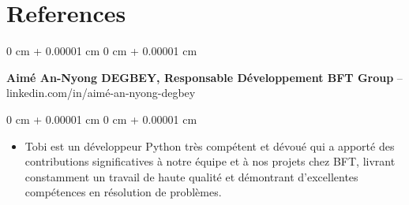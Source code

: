 \documentclass[10pt, letterpaper]{article}
\newenvironment{highlights}{
    \begin{itemize}[
        topsep=0.10 cm,
        parsep=0.10 cm,
        partopsep=0pt,
        itemsep=0pt,
        leftmargin=0 cm + 10pt
    ]
}{
    \end{itemize}
} %
\newenvironment{onecolentry}{
    \begin{adjustwidth}{
        0 cm + 0.00001 cm
    }{
        0 cm + 0.00001 cm
    }
}{
    \end{adjustwidth}
} %
\begin{document}
    
    \section{References}



        
        \begin{onecolentry}
            \textbf{Aimé An-Nyong DEGBEY, Responsable Développement BFT Group} -- linkedin.com/in/aimé-an-nyong-degbey\end{onecolentry}

        \vspace{0.10 cm}
        \begin{onecolentry}
            \begin{highlights}
                \item Tobi est un développeur Python très compétent et dévoué qui a apporté des contributions significatives à notre équipe et à nos projets chez BFT, livrant constamment un travail de haute qualité et démontrant d'excellentes compétences en résolution de problèmes.
            \end{highlights}
        \end{onecolentry}



    
\end{document}

